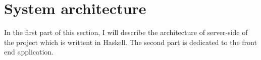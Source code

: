 \section{System architecture}\label{sec:system-architecture}

In the first part of this section, I will describe the architecture of server-side of the project which is writtent in Haskell.
The second part is dedicated to the front end application.
